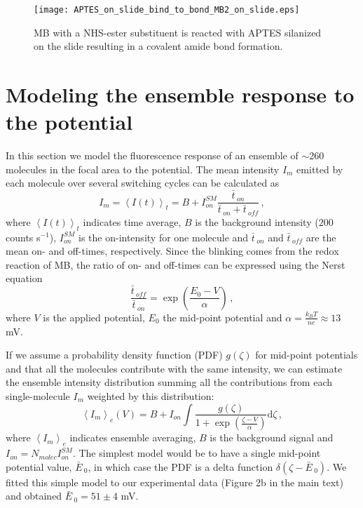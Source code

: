\documentclass[11pt,a4paper,onecolumn]{article}
\newcommand*\me[1]{\ensuremath{\bar{#1}\,}}
\begin{document}
\begin{figure}
  \centering
  \texttt{[image: APTES\_on\_slide\_bind\_to\_bond\_MB2\_on\_slide.eps]}
	\makeatletter
	\renewcommand{\fnum@figure}{\figurename~S\thefigure}
	\makeatother
  \caption{MB with a NHS-ester substituent is reacted with APTES silanized on the slide resulting in a covalent amide bond formation.
	}
  \label{fg:mb_immobilization}
\end{figure}

\section{Modeling the ensemble response to the potential}
In this section we model the fluorescence response of an ensemble of \(\sim\)260 molecules in the focal area to the potential.
The mean intensity $I_m$ emitted by each molecule over several switching cycles can be calculated as 
\begin{equation}
I_m=\left< I(t)\right>_t=B+I_{on}^{SM}\frac{\me{t}_{on}}{\me{t}_{on}+\me{t}_{off}}\,,
\label{eq:Im}
\end{equation}
where $\left< I(t)\right>_t$ indicates time average, $B$ is the background intensity ($200$ counts s$^{-1}$), $I_{on}^{SM}$ is the on-intensity for one molecule and $\me{t}_{on}$ and $\me{t}_{off}$ are the mean on- and off-times, respectively.
Since the blinking comes from the redox reaction of MB, the ratio of on- and off-times can be expressed using the Nerst equation
\begin{equation}
\frac{\me{t}_{off}}{\me{t}_{on}}= \exp\left(\frac{E_0-V}{\alpha}\right)\,,
\label{eq:nerst}
\end{equation}
where $V$ is the applied potential, $E_0$ the mid-point potential and $\alpha=\frac{k_BT}{ne}\approx 13$ mV. 

If we assume a probability density function (PDF) $g(\zeta)$ for mid-point potentials and that all the molecules contribute with the same intensity, we can estimate the ensemble intensity distribution summing all the contributions from each single-molecule $I_m$ weighted by this distribution:
\begin{equation}
\left< I_m\right>_{e}(V)=B + I_{on} \int \frac{g(\zeta)}{1+\exp(\frac{\zeta-V}{\alpha})} \mbox{d}\zeta\,,
\label{eq:ensemble-average}
\end{equation}
where $\left< I_m\right>_{e}$ indicates ensemble averaging, $B$ is the background signal and $I_{on}=N_{molec}I_{on}^{SM}$.
The simplest model would be to have a single mid-point potential value, $\me{E}_0$, in which case the PDF is a delta function $\delta(\zeta-\me{E}_0)$. We fitted this simple model to our experimental data (Figure 2b in the main text) and obtained $\me{E}_0=51 \pm 4$ mV.
\end{document}
